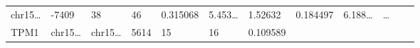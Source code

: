 \documentclass[
]{article}
\begin{document}
\begin{longtable}[]{@{}llllllllllll@{}}
\begin{minipage}[t]{0.06\columnwidth}
chr15\ldots{}\strut
\end{minipage} & \begin{minipage}[t]{0.06\columnwidth}\raggedright
-7409\strut
\end{minipage} & \begin{minipage}[t]{0.06\columnwidth}\raggedright
38\strut
\end{minipage} & \begin{minipage}[t]{0.06\columnwidth}\raggedright
46\strut
\end{minipage} & \begin{minipage}[t]{0.06\columnwidth}\raggedright
0.315068\strut
\end{minipage} & \begin{minipage}[t]{0.08\columnwidth}\raggedright
5.453\ldots{}\strut
\end{minipage} & \begin{minipage}[t]{0.06\columnwidth}\raggedright
1.52632\strut
\end{minipage} & \begin{minipage}[t]{0.06\columnwidth}\raggedright
0.184497\strut
\end{minipage} & \begin{minipage}[t]{0.09\columnwidth}\raggedright
6.188\ldots{}\strut
\end{minipage} & \begin{minipage}[t]{0.02\columnwidth}\raggedright
\ldots{}\strut
\end{minipage}\tabularnewline
\begin{minipage}[t]{0.06\columnwidth}\raggedright
TPM1\strut
\end{minipage} & \begin{minipage}[t]{0.06\columnwidth}\raggedright
chr15\ldots{}\strut
\end{minipage} & \begin{minipage}[t]{0.06\columnwidth}\raggedright
chr15\ldots{}\strut
\end{minipage} & \begin{minipage}[t]{0.06\columnwidth}\raggedright
5614\strut
\end{minipage} & \begin{minipage}[t]{0.06\columnwidth}\raggedright
15\strut
\end{minipage} & \begin{minipage}[t]{0.06\columnwidth}\raggedright
16\strut
\end{minipage} & \begin{minipage}[t]{0.06\columnwidth}\raggedright
0.109589\strut

\end{minipage}
\end{longtable}
\end{document}
